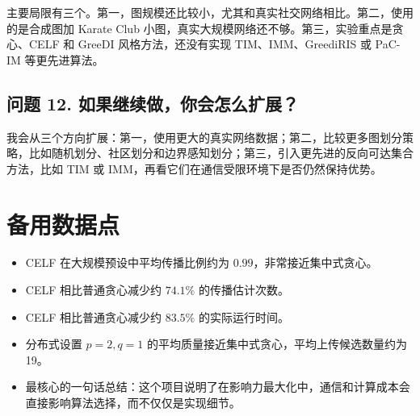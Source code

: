 \documentclass[11pt]{ctexart}
\begin{document}
主要局限有三个。第一，图规模还比较小，尤其和真实社交网络相比。第二，使用的是合成图加 Karate Club 小图，真实大规模网络还不够。第三，实验重点是贪心、CELF 和 GreeDI 风格方法，还没有实现 TIM、IMM、GreediRIS 或 PaC-IM 等更先进算法。

\subsection*{问题 12. 如果继续做，你会怎么扩展？}

我会从三个方向扩展：第一，使用更大的真实网络数据；第二，比较更多图划分策略，比如随机划分、社区划分和边界感知划分；第三，引入更先进的反向可达集合方法，比如 TIM 或 IMM，再看它们在通信受限环境下是否仍然保持优势。

\section*{备用数据点}

\begin{itemize}
    \item CELF 在大规模预设中平均传播比例约为 $0.99$，非常接近集中式贪心。
    \item CELF 相比普通贪心减少约 $74.1\%$ 的传播估计次数。
    \item CELF 相比普通贪心减少约 $83.5\%$ 的实际运行时间。
    \item 分布式设置 $p=2,q=1$ 的平均质量接近集中式贪心，平均上传候选数量约为 19。
    \item 最核心的一句话总结：这个项目说明了在影响力最大化中，通信和计算成本会直接影响算法选择，而不仅仅是实现细节。
\end{itemize}
\end{document}

